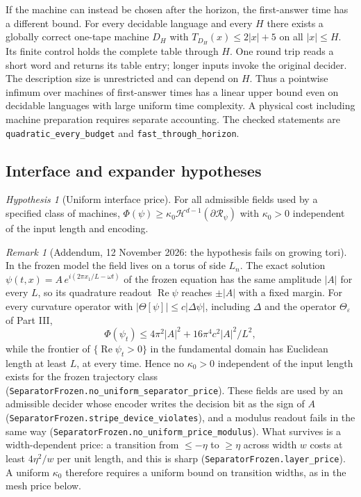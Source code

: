 \documentclass[12pt]{article}
\theoremstyle{remark}
\newtheorem*{remark}{Remark}
\newtheorem{hypothesis}{Hypothesis}[section]
\begin{document}
If the machine can instead be chosen after the horizon, the first-answer
time has a different bound. For every decidable language and every $H$
there exists a globally correct one-tape machine $D_H$ with
$T_{D_H}(x)\le 2|x|+5$ on all $|x|\le H$. Its finite control holds
the complete table through $H$. One round trip reads a short word and
returns its table entry; longer inputs invoke the original decider.
The description size is unrestricted and can depend on $H$. Thus a
pointwise infimum over machines of first-answer times has a linear
upper bound even on decidable languages with large uniform time
complexity. A physical cost including machine preparation requires
separate accounting. The checked statements are
\nolinkurl{quadratic_every_budget} and \nolinkurl{fast_through_horizon}.

\subsection{Interface and expander hypotheses}
\begin{hypothesis}[Uniform interface price]
\label{lem:separator-price}
For all admissible fields used by a specified class of machines,
$\Phi(\psi)\ge\kappa_0\mathcal H^{d-1}(\partial\mathcal R_\psi)$
with $\kappa_0>0$ independent of the input length and encoding.
\end{hypothesis}
\begin{remark}[Addendum, 12 November 2026: the hypothesis fails on growing tori]
\label{rem:separator-price-fails}
In the frozen model the field lives on a torus of side $L_n$.
The exact solution $\psi(t,x)=A\,e^{i(2\pi x_1/L-\omega t)}$ of the
frozen equation has the same amplitude $|A|$ for every $L$, so its
quadrature readout $\operatorname{Re}\psi$ reaches $\pm|A|$ with a fixed
margin.  For every curvature operator with $|\Theta[\psi]|\le c|\Delta\psi|$,
including $\Delta$ and the operator $\Theta_\varepsilon$ of Part III,
\[
 \Phi(\psi_t)\le 4\pi^2|A|^2+16\pi^4c^2|A|^2/L^2,
\]
while the frontier of $\{\operatorname{Re}\psi_t>0\}$ in the
fundamental domain has Euclidean length at least $L$, at every time.
Hence no $\kappa_0>0$ independent of the input length exists for the
frozen trajectory class
(\nolinkurl{SeparatorFrozen.no_uniform_separator_price}).  These
fields are used by an admissible decider whose encoder writes the
decision bit as the sign of $A$
(\nolinkurl{SeparatorFrozen.stripe_device_violates}), and a modulus
readout fails in the same way
(\nolinkurl{SeparatorFrozen.no_uniform_price_modulus}).  What
survives is a width-dependent price: a transition from $\le-\eta$ to
$\ge\eta$ across width $w$ costs at least $4\eta^2/w$ per unit
length, and this is sharp (\nolinkurl{SeparatorFrozen.layer_price}).
A uniform $\kappa_0$ therefore requires a uniform bound on transition
widths, as in the mesh price below.
\end{remark}
\end{document}
